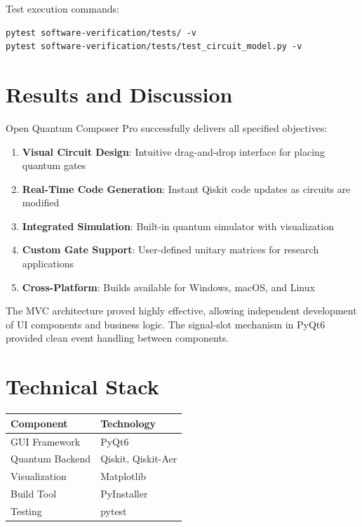 \documentclass[12pt, a4paper, oneside]{report}
\theoremstyle{plain}
\theoremstyle{definition}
\theoremstyle{remark}
\begin{document}
Test execution commands:
\begin{verbatim}
pytest software-verification/tests/ -v
pytest software-verification/tests/test_circuit_model.py -v
\end{verbatim}

\section{Results and Discussion}

Open Quantum Composer Pro successfully delivers all specified objectives:

\begin{enumerate}
	\item \textbf{Visual Circuit Design}: Intuitive drag-and-drop interface for placing quantum gates
	\item \textbf{Real-Time Code Generation}: Instant Qiskit code updates as circuits are modified
	\item \textbf{Integrated Simulation}: Built-in quantum simulator with visualization
	\item \textbf{Custom Gate Support}: User-defined unitary matrices for research applications
	\item \textbf{Cross-Platform}: Builds available for Windows, macOS, and Linux
\end{enumerate}

The MVC architecture proved highly effective, allowing independent development of UI components and business logic. The signal-slot mechanism in PyQt6 provided clean event handling between components.

\section{Technical Stack}

\begin{table}[h]
	\centering
	\begin{tabularx}{\linewidth}{lX}
		\toprule
		\textbf{Component} & \textbf{Technology} \\
		\midrule
		GUI Framework      & PyQt6               \\
		Quantum Backend    & Qiskit, Qiskit-Aer  \\
		Visualization      & Matplotlib          \\
		Build Tool         & PyInstaller         \\
		Testing            & pytest              \\
		\bottomrule
	\end{tabularx}
\end{table}
\end{document}
